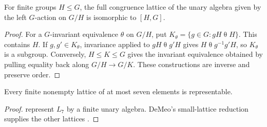 \begin{lemma}\label{f:lem-coset}
For finite groups $H\le G$, the full congruence lattice of the unary algebra
given by the left $G$-action on $G/H$ is isomorphic to $[H,G]$.
\end{lemma}
\begin{proof}
For a $G$-invariant equivalence $\theta$ on $G/H$, put
$K_\theta=\{g\in G:gH\mathrel\theta H\}$. This contains $H$. If
$g,g'\in K_\theta$, invariance applied to $gH\mathrel\theta g'H$ gives
$H\mathrel\theta g^{-1}g'H$, so $K_\theta$ is a subgroup. Conversely,
$H\le K\le G$ gives the invariant equivalence obtained by pulling equality
back along $G/H\to G/K$. These constructions are inverse and preserve order.
\end{proof}

\begin{theorem}\label{f:small-lattices}
Every finite nonempty lattice of at most seven elements is representable.
\end{theorem}
\begin{proof}
 represent $L_7$ by a finite unary
algebra. DeMeo's small-lattice reduction supplies the other lattices
\cite[Theorem~6.1.1]{DeMeo2012}.
\end{proof}
